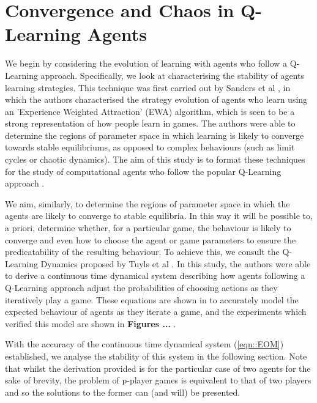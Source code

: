\documentclass[.../main.tex]{subfiles}
\begin{document}
    \section{Convergence and Chaos in Q-Learning Agents} \label{sec::Chaos_in_Q-Learning}

    We begin by considering the evolution of learning with agents who follow a Q-Learning approach.
    Specifically, we look at characterising the stability of agents learning strategies. This
    technique was first carried out by Sanders et al \cite{Sanders}, in which the authors
    characterised the strategy evolution of agents who learn using an 'Experience Weighted
    Attraction' (EWA) algorithm, which is seen to be a strong representation of how people learn in
    games. The authors were able to determine the regions of parameter space in which learning is
    likely to converge towards stable equilibriums, as opposed to complex behaviours (such as limit
    cycles or chaotic dynamics). The aim of this study is to format these techniques for the study
    of computational agents who follow the popular Q-Learning approach \cite{SuttonBarto,Schwarz}.
    
    We aim, similarly, to determine the regions of parameter space in which the agents are likely to
    converge to stable equilibria. In this way it will be possible to, a priori, determine whether,
    for a particular game, the behaviour is likely to converge and even how to choose the agent or
    game parameters to ensure the predicatability of the resulting behaviour. To achieve this, we
    consult the Q-Learning Dynamics proposed by Tuyls et al \cite{TuylsDynamics}. In this study, the
    authors were able to derive a continuous time dynamical system describing how agents following a
    Q-Learning approach adjust the probabilities of choosing actions as they iteratively play a
    game. These equations are shown in \cite{TuylsDynamics} to accurately model the expected
    behaviour of agents as they iterate a game, and the experiments which verified this model are
    shown in \textbf{Figures ...} . 

    With the accuracy of the continuous time dynamical system (\ref{eqn::EOM}) established, we analyse the
    stability of this system in the following section. Note that whilst the derivation provided is
    for the particular case of two agents for the sake of brevity, the problem of p-player games is
    equivalent to that of two players and so the solutions to the former can (and will) be
    presented. 
\end{document}
